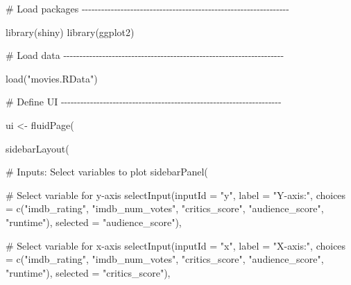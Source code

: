 \documentclass[
  letterpaper,
  DIV=11,
  numbers=noendperiod]{scrreprt}
\newenvironment{Shaded}{\begin{snugshade}}{\end{snugshade}}
\newcommand{\AttributeTok}[1]{\textcolor[rgb]{0.40,0.46,0.14}{#1}}
\newcommand{\CommentTok}[1]{\textcolor[rgb]{0.37,0.37,0.37}{#1}}
\newcommand{\FunctionTok}[1]{\textcolor[rgb]{0.28,0.35,0.67}{#1}}
\newcommand{\NormalTok}[1]{\textcolor[rgb]{0.00,0.46,0.62}{#1}}
\newcommand{\OtherTok}[1]{\textcolor[rgb]{0.00,0.46,0.62}{#1}}
\newcommand{\StringTok}[1]{\textcolor[rgb]{0.13,0.47,0.30}{#1}}
\begin{document}
\begin{Shaded}
\begin{Highlighting}[]
\CommentTok{\# Load packages {-}{-}{-}{-}{-}{-}{-}{-}{-}{-}{-}{-}{-}{-}{-}{-}{-}{-}{-}{-}{-}{-}{-}{-}{-}{-}{-}{-}{-}{-}{-}{-}{-}{-}{-}{-}{-}{-}{-}{-}{-}{-}{-}{-}{-}{-}{-}{-}{-}{-}{-}{-}{-}{-}{-}{-}{-}{-}{-}{-}{-}{-}{-}{-}}

\FunctionTok{library}\NormalTok{(shiny)}
\FunctionTok{library}\NormalTok{(ggplot2)}

\CommentTok{\# Load data {-}{-}{-}{-}{-}{-}{-}{-}{-}{-}{-}{-}{-}{-}{-}{-}{-}{-}{-}{-}{-}{-}{-}{-}{-}{-}{-}{-}{-}{-}{-}{-}{-}{-}{-}{-}{-}{-}{-}{-}{-}{-}{-}{-}{-}{-}{-}{-}{-}{-}{-}{-}{-}{-}{-}{-}{-}{-}{-}{-}{-}{-}{-}{-}{-}{-}{-}{-}}

\FunctionTok{load}\NormalTok{(}\StringTok{"movies.RData"}\NormalTok{)}

\CommentTok{\# Define UI {-}{-}{-}{-}{-}{-}{-}{-}{-}{-}{-}{-}{-}{-}{-}{-}{-}{-}{-}{-}{-}{-}{-}{-}{-}{-}{-}{-}{-}{-}{-}{-}{-}{-}{-}{-}{-}{-}{-}{-}{-}{-}{-}{-}{-}{-}{-}{-}{-}{-}{-}{-}{-}{-}{-}{-}{-}{-}{-}{-}{-}{-}{-}{-}{-}{-}{-}{-}}

\NormalTok{ui }\OtherTok{\textless{}{-}} \FunctionTok{fluidPage}\NormalTok{(}
  
  \FunctionTok{sidebarLayout}\NormalTok{(}
    
    \CommentTok{\# Inputs: Select variables to plot}
    \FunctionTok{sidebarPanel}\NormalTok{(}
      
      \CommentTok{\# Select variable for y{-}axis}
      \FunctionTok{selectInput}\NormalTok{(}\AttributeTok{inputId =} \StringTok{"y"}\NormalTok{, }
                  \AttributeTok{label =} \StringTok{"Y{-}axis:"}\NormalTok{,}
                  \AttributeTok{choices =} \FunctionTok{c}\NormalTok{(}\StringTok{"imdb\_rating"}\NormalTok{, }\StringTok{"imdb\_num\_votes"}\NormalTok{, }\StringTok{"critics\_score"}\NormalTok{, }\StringTok{"audience\_score"}\NormalTok{, }\StringTok{"runtime"}\NormalTok{), }
                  \AttributeTok{selected =} \StringTok{"audience\_score"}\NormalTok{),}
      
      \CommentTok{\# Select variable for x{-}axis}
      \FunctionTok{selectInput}\NormalTok{(}\AttributeTok{inputId =} \StringTok{"x"}\NormalTok{, }
                  \AttributeTok{label =} \StringTok{"X{-}axis:"}\NormalTok{,}
                  \AttributeTok{choices =} \FunctionTok{c}\NormalTok{(}\StringTok{"imdb\_rating"}\NormalTok{, }\StringTok{"imdb\_num\_votes"}\NormalTok{, }\StringTok{"critics\_score"}\NormalTok{, }\StringTok{"audience\_score"}\NormalTok{, }\StringTok{"runtime"}\NormalTok{), }
                  \AttributeTok{selected =} \StringTok{"critics\_score"}\NormalTok{),}
      

\end{Highlighting}
\end{Shaded}
\end{document}
